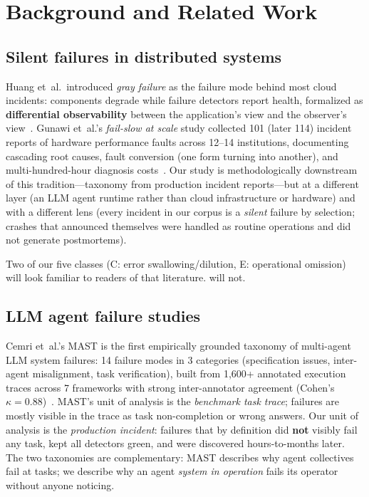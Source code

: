 \section{Background and Related Work}\label{sec:related}

\subsection{Silent failures in distributed systems}

Huang et~al.\ introduced \emph{gray failure} as the failure mode behind
most cloud incidents: components degrade while failure detectors report
health, formalized as \textbf{differential observability} between the
application's view and the observer's view~\cite{huang2017gray}. Gunawi
et~al.'s \emph{fail-slow at scale} study collected 101 (later 114)
incident reports of hardware performance faults across 12--14
institutions, documenting cascading root causes, fault conversion (one
form turning into another), and multi-hundred-hour diagnosis
costs~\cite{gunawi2018failslow}. Our study is methodologically downstream
of this tradition---taxonomy from production incident reports---but at a
different layer (an LLM agent runtime rather than cloud infrastructure or
hardware) and with a different lens (every incident in our corpus is a
\emph{silent} failure by selection; crashes that announced themselves
were handled as routine operations and did not generate postmortems).

Two of our five classes (C: error swallowing/dilution, E: operational
omission) will look familiar to readers of that literature.
 will not.

\subsection{LLM agent failure studies}\label{sec:related-agents}

Cemri et~al.'s MAST is the first empirically grounded taxonomy of
multi-agent LLM system failures: 14 failure modes in 3 categories
(specification issues, inter-agent misalignment, task verification),
built from 1{,}600+ annotated execution traces across 7 frameworks with
strong inter-annotator agreement (Cohen's
$\kappa = 0.88$)~\cite{cemri2025mast}. MAST's unit of analysis is the
\emph{benchmark task trace}; failures are mostly visible in the trace as
task non-completion or wrong answers. Our unit of analysis is the
\emph{production incident}: failures that by definition did \textbf{not}
visibly fail any task, kept all detectors green, and were discovered
hours-to-months later. The two taxonomies are complementary: MAST
describes why agent collectives fail at tasks; we describe why an agent
\emph{system in operation} fails its operator without anyone noticing.

